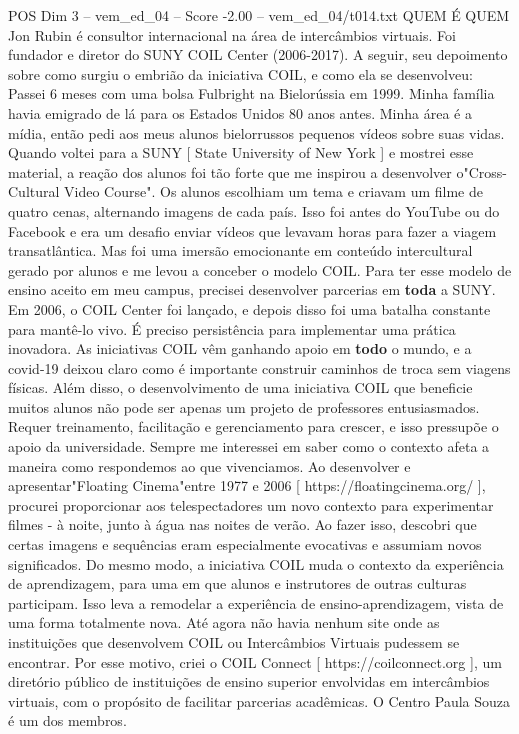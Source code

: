 \begin{textsample}{POS Dim 3 – vem\_ed\_04 – Score -2.00 – vem\_ed\_04/t014.txt}  \label{ex:f3_pos_092}
QUEM É QUEM Jon Rubin é consultor internacional na área de intercâmbios virtuais.
Foi fundador e diretor do SUNY COIL Center (2006-2017).
A seguir, seu depoimento sobre como surgiu o embrião da iniciativa COIL, e como ela se desenvolveu: Passei 6 meses com uma bolsa Fulbright na Bielorússia em 1999.
Minha família havia emigrado de lá para os Estados Unidos 80 anos antes.
Minha área é a mídia, então pedi aos meus alunos bielorrussos pequenos vídeos sobre suas vidas.
Quando voltei para a SUNY [ State University of New York ] e mostrei esse material, a reação dos alunos foi tão forte que me inspirou a desenvolver o"Cross-Cultural Video Course".
Os alunos escolhiam um tema e criavam um filme de quatro cenas, alternando imagens de cada país.
Isso foi antes do YouTube ou do Facebook e era um desafio enviar vídeos que levavam horas para fazer a viagem transatlântica.
Mas foi uma imersão emocionante em conteúdo intercultural gerado por alunos e me levou a conceber o modelo COIL.
Para ter esse modelo de ensino aceito em meu campus, precisei desenvolver parcerias em \textbf{toda} a SUNY.
Em 2006, o COIL Center foi lançado, e depois disso foi uma batalha constante para mantê-lo vivo.
É preciso persistência para implementar uma prática inovadora.
As iniciativas COIL vêm ganhando apoio em \textbf{todo} o mundo, e a covid-19 deixou claro como é importante construir caminhos de troca sem viagens físicas.
Além disso, o desenvolvimento de uma iniciativa COIL que beneficie muitos alunos não pode ser apenas um projeto de professores entusiasmados.
Requer treinamento, facilitação e gerenciamento para crescer, e isso pressupõe o apoio da universidade.
Sempre me interessei em saber como o contexto afeta a maneira como respondemos ao que vivenciamos.
Ao desenvolver e apresentar"Floating Cinema"entre 1977 e 2006 [ https://floatingcinema.org/ ], procurei proporcionar aos telespectadores um novo contexto para experimentar filmes - à noite, junto à água nas noites de verão.
Ao fazer isso, descobri que certas imagens e sequências eram especialmente evocativas e assumiam novos significados.
Do mesmo modo, a iniciativa COIL muda o contexto da experiência de aprendizagem, para uma em que alunos e instrutores de outras culturas participam.
Isso leva a remodelar a experiência de ensino-aprendizagem, vista de uma forma totalmente nova.
Até agora não havia nenhum site onde as instituições que desenvolvem COIL ou Intercâmbios Virtuais pudessem se encontrar.
Por esse motivo, criei o COIL Connect [ https://coilconnect.org ], um diretório público de instituições de ensino superior envolvidas em intercâmbios virtuais, com o propósito de facilitar parcerias acadêmicas.
O Centro Paula Souza é um dos membros.

\end{textsample}
